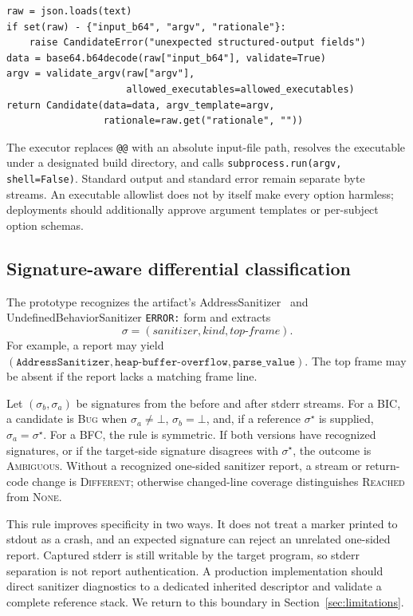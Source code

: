\documentclass{article}
\begin{document}
\begin{lstlisting}[style=pluscode,caption={Core structured-candidate parser (abridged).},label={lst:candidate}]
raw = json.loads(text)
if set(raw) - {"input_b64", "argv", "rationale"}:
    raise CandidateError("unexpected structured-output fields")
data = base64.b64decode(raw["input_b64"], validate=True)
argv = validate_argv(raw["argv"],
                     allowed_executables=allowed_executables)
return Candidate(data=data, argv_template=argv,
                 rationale=raw.get("rationale", ""))
\end{lstlisting}

The executor replaces \texttt{@@} with an absolute input-file path, resolves
the executable under a designated build directory, and calls
\texttt{subprocess.run(argv, shell=False)}.  Standard output and standard error
remain separate byte streams.  An executable allowlist does not by itself make
every option harmless; deployments should additionally approve argument
templates or per-subject option schemas.

\subsection{Signature-aware differential classification}
\label{sec:design:oracle}

The prototype recognizes the artifact's AddressSanitizer~\cite{google_sanitizers}
and UndefinedBehaviorSanitizer \texttt{ERROR:} form and extracts
\[
  \sigma=(\textit{sanitizer},\textit{kind},\textit{top-frame}).
\]
For example, a report may yield
$(\texttt{AddressSanitizer},\texttt{heap-buffer-overflow},
\texttt{parse\_value})$.  The top frame may be absent if the report lacks a
matching frame line.

Let $(\sigma_b,\sigma_a)$ be signatures from the before and after stderr
streams.  For a BIC, a candidate is \textsc{Bug} when
$\sigma_a\neq\bot$, $\sigma_b=\bot$, and, if a reference
$\sigma^\star$ is supplied, $\sigma_a=\sigma^\star$.  For a BFC, the rule is
symmetric.  If both versions have recognized signatures, or if the target-side
signature disagrees with $\sigma^\star$, the outcome is \textsc{Ambiguous}.
Without a recognized one-sided sanitizer report, a stream or return-code
change is \textsc{Different}; otherwise changed-line coverage distinguishes
\textsc{Reached} from \textsc{None}.

This rule improves specificity in two ways.  It does not treat a marker printed
to stdout as a crash, and an expected signature can reject an unrelated
one-sided report.  Captured stderr is still writable by the target program, so
stderr separation is not report authentication.  A production implementation
should direct sanitizer diagnostics to a dedicated inherited descriptor and
validate a complete reference stack.  We return to this boundary in Section~\ref{sec:limitations}.
\end{document}
